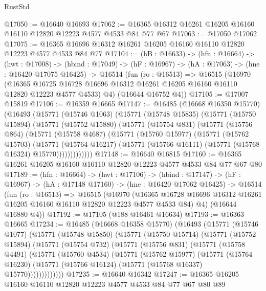 \begin{lexlean}{RustStd}
\begin{coremodule}
@17050 := @16640 @16693
@17062 := @16365 @16312 @16261 @16205 @16160 @16110 @12820 @12223 @4577 @4533 @84 @77 @67
@17063 := @17050 @17062
@17075 := @16365 @16696 @16312 @16261 @16205 @16160 @16110 @12820 @12223 @4577 @4533 @84 @77
@17104 := (hB : @16633) ->
  (hfn : @16664) ->
  (hwt : @17008) ->
  (hbind : @17049) ->
  (hF : @16967) ->
  (hA : @17063) ->
  (hne : @16420 @17075 @16425) ->
  @16514
    (fun (ro : @16513) =>
    @16515
      (@16970
        (@16365 @16725 @16728 @16696 @16312 @16261 @16205 @16160 @16110 @12820 @12223 @4577 @4533)
        @4)
      (@16644 @16752 @4))
@17105 := @17007 @15819
@17106 := @16359 @16665
@17147 := @16485
    (@16668 @16350 @15770)
    (@16493
      (@15771
        (@15746 @1063)
        (@15771
          (@15748 @15835)
          (@15771
            (@15750 @15894)
            (@15771
              (@15752 @15880)
              (@15771
                (@15754 @831)
                (@15771
                  (@15756 @864)
                  (@15771
                    (@15758 @4687)
                    (@15771
                      (@15760 @15977)
                      (@15771
                        (@15762 @15703)
                        (@15771
                          (@15764 @16217)
                          (@15771 (@15766 @16111) (@15771 (@15768 @16324) @15770)))))))))))))
@17148 := @16640 @16815
@17160 := @16365 @16261 @16205 @16160 @16110 @12820 @12223 @4577 @4533 @84 @77 @67 @80
@17189 := (hfn : @16664) ->
  (hwt : @17106) ->
  (hbind : @17147) ->
  (hF : @16967) ->
  (hA : @17148 @17160) ->
  (hne : @16420 @17062 @16425) ->
  @16514
    (fun (ro : @16513) =>
    @16515
      (@16970
        (@16365 @16728 @16696 @16312 @16261 @16205 @16160 @16110 @12820 @12223 @4577 @4533 @84)
        @4)
      (@16644 @16880 @4))
@17192 := @17105 (@188 @16461 @16634)
@17193 := @16363 @16665
@17234 := @16485
    (@16668 @16358 @15770)
    (@16493
      (@15771
        (@15746 @1077)
        (@15771
          (@15748 @15850)
          (@15771
            (@15750 @15714)
            (@15771
              (@15752 @15894)
              (@15771
                (@15754 @732)
                (@15771
                  (@15756 @831)
                  (@15771
                    (@15758 @4491)
                    (@15771
                      (@15760 @4534)
                      (@15771
                        (@15762 @15977)
                        (@15771
                          (@15764 @16230)
                          (@15771 (@15766 @16124) (@15771 (@15768 @16337) @15770)))))))))))))
@17235 := @16640 @16342
@17247 := @16365 @16205 @16160 @16110 @12820 @12223 @4577 @4533 @84 @77 @67 @80 @89

\end{coremodule}
\end{lexlean}
